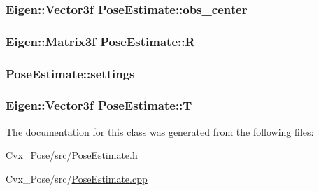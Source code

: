 \hypertarget{classPoseEstimate_a3431f3d795bc7e5ec3108c923cf4eb9f}{
\subsubsection[{obs\-\_\-center}]{\setlength{\rightskip}{0pt plus 5cm}\-Eigen\-::\-Vector3f {\bf \-Pose\-Estimate\-::obs\-\_\-center}}}\label{classPoseEstimate_a3431f3d795bc7e5ec3108c923cf4eb9f}
\hypertarget{classPoseEstimate_a45910f753f4c92260252d965af504cc8}{
\subsubsection[{\-R}]{\setlength{\rightskip}{0pt plus 5cm}\-Eigen\-::\-Matrix3f {\bf \-Pose\-Estimate\-::\-R}}}\label{classPoseEstimate_a45910f753f4c92260252d965af504cc8}
\hypertarget{classPoseEstimate_ae1d0b8586991b50d575afa6b8bae92da}{
\subsubsection[{settings}]{ {\bf \-Pose\-Estimate\-::settings}}}\label{classPoseEstimate_ae1d0b8586991b50d575afa6b8bae92da}
\hypertarget{classPoseEstimate_a31a1a39ab75efc08a00ddc8f8f75b60b}{
\subsubsection[{\-T}]{\setlength{\rightskip}{0pt plus 5cm}\-Eigen\-::\-Vector3f {\bf \-Pose\-Estimate\-::\-T}}}\label{classPoseEstimate_a31a1a39ab75efc08a00ddc8f8f75b60b}


\-The documentation for this class was generated from the following files\-:\begin{DoxyCompactItemize}
\item 
\-Cvx\-\_\-\-Pose/src/\hyperlink{PoseEstimate_8h}{\-Pose\-Estimate.\-h}\item 
\-Cvx\-\_\-\-Pose/src/\hyperlink{PoseEstimate_8cpp}{\-Pose\-Estimate.\-cpp}\end{DoxyCompactItemize}
